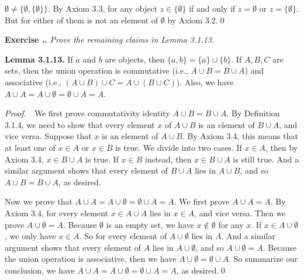 \documentclass{book}
\newcommand{\pff}{\vspace{.25em}\noindent\emph{Proof.}~~}
\newcommand{\titl}[1]{\noindent\textbf{#1}}
\newcounter{Exercise}[section]
\renewcommand{\theExercise}{\thesection.\arabic{Exercise}.}
\newcommand{\new}{\vspace{1.5em}\noindent\textbf{{Exercise \stepcounter{Exercise}\textbf{\theExercise}}} }
\begin{document}
$\emptyset\neq\{\emptyset,\{\emptyset\}\}$. By Axiom 3.3, for any object $z\in\{\emptyset\}$ if and only if $z=\emptyset$ or $z=\{\emptyset\}$. But for either of them is not an element of $\emptyset$ by Axiom 3.2.\qed

\begin{comment}
\new\emph{If $A,B,A'$ are sets, and $A$ is equal to $A'$, then $A\cup B$ is equal to $A'\cup B$ (why? One needs to use Axiom 3.4 and Definition 3.1.4).}

\pff We need to show that every element $x$ of $A\cup B$ is an element of $A'\cup B$, and vice versa. So we suppose first that $x$ is an element of $A\cup B$. By Axiom 3.4, this means that at least one of $x\in A$ or $x\in B$ is true. We now divide into two cases. If $x\in A$, by assumption that $A=A'$, and by Axiom 3.4, $x\in A\cup B$. Now suppose instead $x\in B$, then by Axiom 3.4. again $x\in A'\cup B$. So for every element of $A\cup B$ lies in $A'\cup B$. A similar argument shows that every element of $A'\cup B$ lies in $A\cup B$, and so $A\cup B=A'\cup B$ as desired.\qed
\end{comment}

\new\emph{Prove the remaining claims in Lemma 3.1.13.}

\begin{framed}
\titl{Lemma 3.1.13.} If $a$ and $b$ are objects, then $\{a,b\}=\{a\}\cup\{b\}$. If $A,B,C$ are sets, then the union operation is commutative (i.e., $A\cup B=B\cup A$) and associative (i.e., $(A\cup B)\cup C=A\cup (B\cup C)$). Also, we have $A\cup A=A\cup\emptyset=\emptyset\cup A=A$.
\end{framed}

\pff We first prove commutativity identity $A\cup B=B\cup A$. By Definition 3.1.4, we need to show that every element $x$ of $A\cup B$ is an element of $B\cup A$, and vice versa. Suppose that $x$ is an element of $A\cup B$. By Axiom 3.4, this means that at least one of $x\in A$ or $x\in B$ is true. We divide into two cases. If $x\in A$, then by Axiom 3.4, $x\in B\cup A$ is true. If $x\in B$ instead, then $x\in B\cup A$ is still true. And a similar argument shows that every element of $B\cup A$ lies in $A\cup B$, and so $A\cup B=B\cup A$, as desired.

Now we prove that $A\cup A=A\cup\emptyset=\emptyset\cup A=A$. We first prove $A\cup A=A$. By Axiom 3.4, for every element $x\in A\cup A$ lies in $x\in A$, and vice versa. Then we prove $A\cup\emptyset=A$. Because $\emptyset$ is an empty set, we have $x\notin\emptyset$ for any $x$. If $x\in A\cup\emptyset$, we only have $x\in A$. So for every element of $A\cup\emptyset$ lies in $A$. And a similar argument shows that every element of $A$ lies in $A\cup\emptyset$, and so $A\cup\emptyset=A$. Because the union operation is associative, then we have $A\cup\emptyset=\emptyset\cup A$. So summarize our conclusion, we have $A\cup A=A\cup\emptyset=\emptyset\cup A=A$, as desired.\qed
\end{document}
